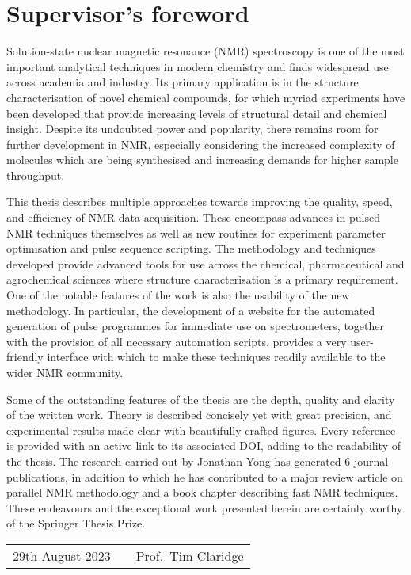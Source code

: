 \chapter{Supervisor's foreword}

Solution-state nuclear magnetic resonance (NMR) spectroscopy is one of the most important analytical techniques in modern chemistry and finds widespread use across academia and industry.
Its primary application is in the structure characterisation of novel chemical compounds, for which myriad experiments have been developed that provide increasing levels of structural detail and chemical insight.
Despite its undoubted power and popularity, there remains room for further development in NMR, especially considering the increased complexity of molecules which are being synthesised and increasing demands for higher sample throughput.  

This thesis describes multiple approaches towards improving the quality, speed, and efficiency of NMR data acquisition.
These encompass advances in pulsed NMR techniques themselves as well as new routines for experiment parameter optimisation and pulse sequence scripting.
The methodology and techniques developed provide advanced tools for use across the chemical, pharmaceutical and agrochemical sciences where structure characterisation is a primary requirement.
One of the notable features of the work is also the usability of the new methodology.
In particular, the development of a website for the automated generation of pulse programmes for immediate use on spectrometers, together with the provision of all necessary automation scripts, provides a very user-friendly interface with which to make these techniques readily available to the wider NMR community. 

Some of the outstanding features of the thesis are the depth, quality and clarity of the written work.
Theory is described concisely yet with great precision, and experimental results made clear with beautifully crafted figures.
Every reference is provided with an active link to its associated DOI, adding to the readability of the thesis.
The research carried out by Jonathan Yong has generated 6 journal publications, in addition to which he has contributed to a major review article on parallel NMR methodology and a book chapter describing fast NMR techniques.
These endeavours and the exceptional work presented herein are certainly worthy of the Springer Thesis Prize. 

\vspace{0.3cm}

\hfuzz=30pt
\begin{tabularx}{\textwidth}{@{}lXr@{}}
    29th August 2023 & & Prof.\ Tim Claridge
\end{tabularx}
